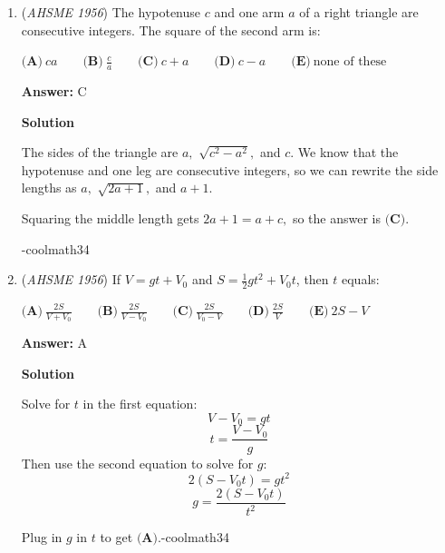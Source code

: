 \begin{enumerate}
 \textbf{Answer: }D



\textbf{Solution}

The area of this triangle can be expressed in two ways; the first being $\frac{ab}{2}$ (as this is a right triangle), and the second being $\frac{cx}{2}$. But by the \href{https://artofproblemsolving.com/wiki/index.php?title=Pythagorean\_Theorem}{Pythagorean Theorem}, $c=\sqrt{a^2+b^2}$. Thus a second way of finding the area of the triangle is $\frac{x\sqrt{a^2+b^2}}{2}$. By setting them equal to each other we get $x=\frac{ab}{\sqrt{a^2+b^2}}$, and we can observe that the correct answer is $\boxed{\textbf{(D) \ }}$.

 


	\item (\textit{AHSME 1956}) The hypotenuse $c$ and one arm $a$ of a right triangle are consecutive integers. The square of the second arm is: 


 $\textbf{(A)}\ ca\qquad \textbf{(B)}\ \frac{c}{a}\qquad \textbf{(C)}\ c+a\qquad \textbf{(D)}\ c-a\qquad  \textbf{(E)}\ \text{none of these}$

 \textbf{Answer: }C



\textbf{Solution}

The sides of the triangle are $a,$ $\sqrt{c^2-a^2},$ and $c.$ We know that the hypotenuse and one leg are consecutive integers, so we can rewrite the side lengths as $a,$ $\sqrt{2a+1},$ and $a+1.$

 Squaring the middle length gets $2a + 1 = a + c,$ so the answer is $\boxed{\textbf{(C)}}.$

 -coolmath34

 


	\item (\textit{AHSME 1956}) If $V = gt + V_0$ and $S = \frac {1}{2}gt^2 + V_0t$, then $t$ equals: 


 $\textbf{(A)}\ \frac{2S}{V+V_0}\qquad \textbf{(B)}\ \frac{2S}{V-V_0}\qquad \textbf{(C)}\ \frac{2S}{V_0-V}\qquad \textbf{(D)}\ \frac{2S}{V}\qquad \textbf{(E)}\ 2S-V$

 \textbf{Answer: }A



\textbf{Solution}

Solve for $t$ in the first equation:
 \[V - V_0 = gt\]
 \[t = \frac{V - V_0}{g}\]Then use the second equation to solve for $g:$
 \[2(S - V_0 t) = gt^2\]
 \[g = \frac{2(S - V_0 t)}{t^2}\]

 Plug in $g$ in $t$ to get $\boxed{\textbf{(A)}}.$-coolmath34


\end{enumerate}
